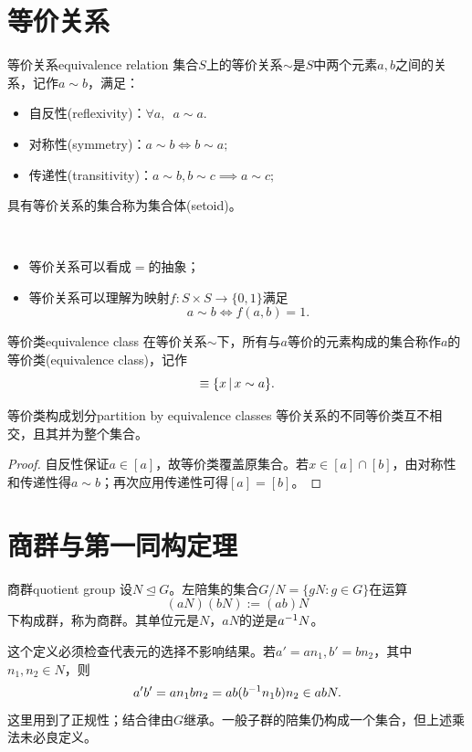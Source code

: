 \section{等价关系}

\begin{definition}{等价关系}{equivalence relation}
	集合$S$上的等价关系$\sim$是$S$中两个元素$a,b$之间的关系，记作$a \sim b$，满足：
	\begin{itemize}
		\item 自反性(reflexivity)：$\forall a,\enspace a \sim a.$
		\item 对称性(symmetry)：$a \sim b \iff b \sim a;$
		\item 传递性(transitivity)：$a \sim b,b \sim c \implies a \sim c;$
	\end{itemize}
	具有等价关系的集合称为集合体(setoid)。
\end{definition}
\begin{remark}~
	\begin{itemize}
		\item 等价关系可以看成$=$的抽象；
		\item 等价关系可以理解为映射$f:S \times S \to \{0,1\}$满足
		\[
			a \sim b \iff f(a,b) = 1.
		\]
	\end{itemize}
\end{remark}

\begin{definition}
	{等价类}{equivalence class}
	在等价关系$\sim$下，所有与$a$等价的元素构成的集合称作$a$的等价类(equivalence class)，记作 
	\begin{equation}
		[a] \equiv \set x{x \sim a}.
	\end{equation}
\end{definition}



\begin{theorem}{等价类构成划分}{partition by equivalence classes}
    等价关系的不同等价类互不相交，且其并为整个集合。
\end{theorem}
\begin{proof}
    自反性保证$a \in [a]$，故等价类覆盖原集合。若$x \in [a] \cap [b]$，由对称性和传递性得$a \sim b$；再次应用传递性可得$[a] = [b]$。
\end{proof}

\section{商群与第一同构定理}
\begin{definition}{商群}{quotient group}
    设$N\trianglelefteq G$。左陪集的集合$G/N = \{gN:g \in G\}$在运算
    \begin{equation}\label{eq:la-quotient-group-product}
        (aN)(bN) := (ab)N
    \end{equation}
    下构成群，称为商群。其单位元是$N$，$aN$的逆是$a^{-1} N$。
\end{definition}
这个定义必须检查代表元的选择不影响结果。若$a' = an_1,b' = bn_2$，其中$n_1,n_2 \in N$，则
\[
    a'b' = an_1bn_2 = ab(b^{-1} n_1b)n_2 \in abN.
\]
这里用到了正规性；结合律由$G$继承。一般子群的陪集仍构成一个集合，但上述乘法未必良定义。

